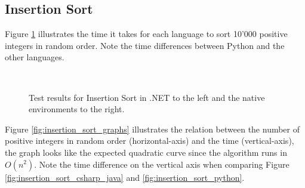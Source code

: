 \subsection{Insertion Sort}

Figure \ref{fig:insertion_sort_results} illustrates the time it takes for each language to sort 10'000 positive integers in random order. Note the time differences between Python and the other languages.

\begin{figure}[h]
	\centering
	\mbox{
	}
	\caption{Test results for Insertion Sort in .NET to the left and the native environments to the right.}
	\label{fig:insertion_sort_results}
\end{figure}

Figure \ref{fig:insertion_sort_graphs} illustrates the relation between the number of positive integers in random order (horizontal-axis) and the time (vertical-axis), the graph looks like the expected quadratic curve since the algorithm runs in $O(n^2)$. Note the time difference on the vertical axis when comparing Figure \ref{fig:insertion_sort_csharp_java} and \ref{fig:insertion_sort_python}.

